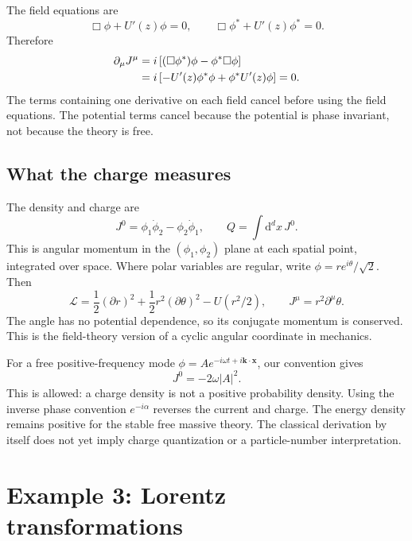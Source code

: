 \documentclass[11pt]{article}
\newcommand{\dd}{\mathrm{d}}
\newcommand{\Lag}{\mathcal{L}}
\begin{document}
The field equations are
\begin{equation}
\Box\phi+U'(z)\phi=0,\qquad
\Box\phi^*+U'(z)\phi^*=0.
\end{equation}
Therefore
\begin{align}
\partial_\mu J^\mu
&=i\left[(\Box\phi^*)\phi-\phi^*\Box\phi\right]\notag\\
&=i\left[-U'(z)\phi^*\phi+\phi^*U'(z)\phi\right]=0.
\end{align}
The terms containing one derivative on each field cancel before using the
field equations. The potential terms cancel because the potential is
phase invariant, not because the theory is free.

\subsection{What the charge measures}
The density and charge are
\begin{equation}
J^0=\phi_1\dot\phi_2-\phi_2\dot\phi_1,
\qquad Q=\int\dd^d x\,J^0.
\end{equation}
This is angular momentum in the \((\phi_1,\phi_2)\) plane at each
spatial point, integrated over space. Where polar variables are regular,
write \(\phi=r e^{i\theta}/\sqrt2\). Then
\begin{equation}
\Lag=\frac12(\partial r)^2+\frac12r^2(\partial\theta)^2-U(r^2/2),
\qquad J^\mu=r^2\partial^\mu\theta.
\end{equation}
The angle has no potential dependence, so its conjugate momentum is
conserved. This is the field-theory version of a cyclic angular coordinate
in mechanics.

For a free positive-frequency mode
\(\phi=Ae^{-i\omega t+i\bm k\cdot\bm x}\), our convention gives
\begin{equation}
J^0=-2\omega|A|^2.
\end{equation}
This is allowed: a charge density is not a positive probability density.
Using the inverse phase convention \(e^{-i\alpha}\) reverses the current
and charge. The energy density remains positive for the stable free
massive theory. The classical derivation by itself does not yet imply
charge quantization or a particle-number interpretation.

\section{Example 3: Lorentz transformations}
\end{document}
